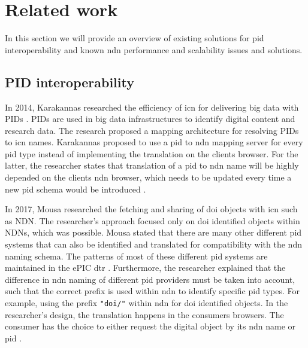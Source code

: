 \section{Related work}
\label{introduction-related-work}

In this section we will provide an overview of existing solutions for \gls{pid} interoperability and known \gls{ndn} performance and scalability issues and solutions.

\subsection{PID interoperability}
\label{introduction-pid}
In 2014, Karakannas researched the efficiency of \gls{icn} for delivering big data with PIDs \cite{icn-bd}. PIDs are used in big data infrastructures to identify digital content and research data. The research proposed a mapping architecture for resolving PIDs to \gls{icn} names. Karakannas proposed to use a \gls{pid} to \gls{ndn} mapping server for every \gls{pid} type instead of implementing the translation on the clients browser. For the latter, the researcher states that translation of a \gls{pid} to \gls{ndn} name will be highly depended on the clients \gls{ndn} browser, which needs to be updated every time a new \gls{pid} schema would be introduced \cite{icn-bd}.

In 2017, Mousa researched the fetching and sharing of \gls{doi} objects with \gls{icn} such as NDN. 
The researcher's approach focused only on \gls{doi} identified objects within NDNs, which was possible. Mousa stated that there are many other different \gls{pid} systems that can also be identified and translated for compatibility with the \gls{ndn} naming schema. The patterns of most of these different \gls{pid} systems are maintained in the ePIC \gls{dtr} \cite{dtr}.
 Furthermore, the researcher explained that the difference in \gls{ndn} naming of different \gls{pid} providers must be taken into account, such that the correct prefix is used within \gls{ndn} to identify specific \gls{pid} types. For example, using the prefix \texttt{"doi/"} within \gls{ndn} for \gls{doi} identified objects.
In the researcher's design, the translation happens in the consumers browsers. The consumer has the choice to either request the digital object by its \gls{ndn} name or \gls{pid} \cite{ndn-app-aware}.

